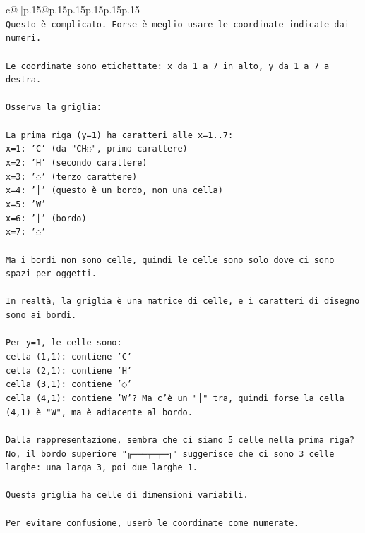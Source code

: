 \documentclass{article}
\begin{document}
{\begin{supertabular}{c@{$\;$}|p{.15\linewidth}@{}p{.15\linewidth}p{.15\linewidth}p{.15\linewidth}p{.15\linewidth}p{.15\linewidth}}
{{{\\ 
\texttt{Questo è complicato. Forse è meglio usare le coordinate indicate dai numeri.} \\
\\ 
\texttt{Le coordinate sono etichettate: x da 1 a 7 in alto, y da 1 a 7 a destra.} \\
\\ 
\texttt{Osserva la griglia:} \\
\\ 
\texttt{La prima riga (y=1) ha caratteri alle x=1..7: } \\
\texttt{x=1: 'C' (da "CH◌", primo carattere)} \\
\texttt{x=2: 'H' (secondo carattere)} \\
\texttt{x=3: '◌' (terzo carattere)} \\
\texttt{x=4: '│' (questo è un bordo, non una cella)} \\
\texttt{x=5: 'W' } \\
\texttt{x=6: '│' (bordo)} \\
\texttt{x=7: '◌' } \\
\\ 
\texttt{Ma i bordi non sono celle, quindi le celle sono solo dove ci sono spazi per oggetti.} \\
\\ 
\texttt{In realtà, la griglia è una matrice di celle, e i caratteri di disegno sono ai bordi.} \\
\\ 
\texttt{Per y=1, le celle sono:} \\
\texttt{cella (1,1): contiene 'C'} \\
\texttt{cella (2,1): contiene 'H'} \\
\texttt{cella (3,1): contiene '◌'} \\
\texttt{cella (4,1): contiene 'W'? Ma c'è un "│" tra, quindi forse la cella (4,1) è "W", ma è adiacente al bordo.} \\
\\ 
\texttt{Dalla rappresentazione, sembra che ci siano 5 celle nella prima riga? No, il bordo superiore "╔═══╤═╤═╗" suggerisce che ci sono 3 celle larghe: una larga 3, poi due larghe 1.} \\
\\ 
\texttt{Questa griglia ha celle di dimensioni variabili.} \\
\\ 
\texttt{Per evitare confusione, userò le coordinate come numerate.} \\
\\ 
}}}
\end{supertabular}}
\end{document}
